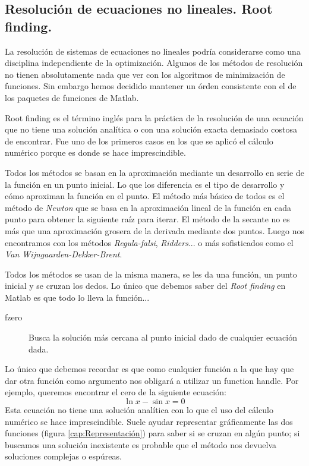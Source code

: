 \subsection{Resolución de ecuaciones no lineales. Root finding.}

La resolución de sistemas de ecuaciones no lineales podría
considerarse como una disciplina independiente de la optimización.
Algunos de los métodos de resolución no tienen absolutamente nada que
ver con los algoritmos de minimización de funciones. Sin embargo hemos
decidido mantener un órden consistente con el de los paquetes de
funciones de Matlab.

Root finding es el término inglés para la práctica de la resolución de
una ecuación que no tiene una solución analítica o con una solución
exacta demasiado costosa de encontrar. Fue uno de los primeros casos
en los que se aplicó el cálculo numérico porque es donde se hace
imprescindible.

Todos los métodos se basan en la aproximación mediante un desarrollo
en serie de la función en un punto inicial. Lo que los diferencia es
el tipo de desarrollo y cómo aproximan la función en el punto.  El
método más básico de todos es el método de \emph{Newton} que se basa
en la aproximación lineal de la función en cada punto para obtener la
siguiente raíz para iterar. El método de la secante no es más que una
aproximación grosera de la derivada mediante dos puntos. Luego nos
encontramos con los métodos \emph{Regula-falsi}, \emph{Ridders}...  o
más sofisticados como el \emph{Van Wijngaarden-Dekker-Brent}.

Todos los métodos se usan de la misma manera, se les da una función,
un punto inicial y se cruzan los dedos. Lo único que debemos saber del
\emph{Root finding} en Matlab es que todo lo lleva la función...

\begin{description}
\item [fzero]Busca la solución más cercana al punto
  inicial dado de cualquier ecuación dada.
\end{description}
Lo único que debemos recordar es que como cualquier función a la que
hay que dar otra función como argumento nos obligará a utilizar un
function handle. Por ejemplo, queremos encontrar el cero de la
siguiente ecuación:
$$ \ln x-\sin x=0$$
Esta ecuación no tiene una solución analítica con lo que el uso del
cálculo numérico se hace imprescindible. Suele ayudar representar
gráficamente las dos funciones (figura
\ref{cap:Representación}) para saber si se cruzan en algún
punto; si buscamos una solución inexistente es probable que el método
nos devuelva soluciones complejas o espúreas.

